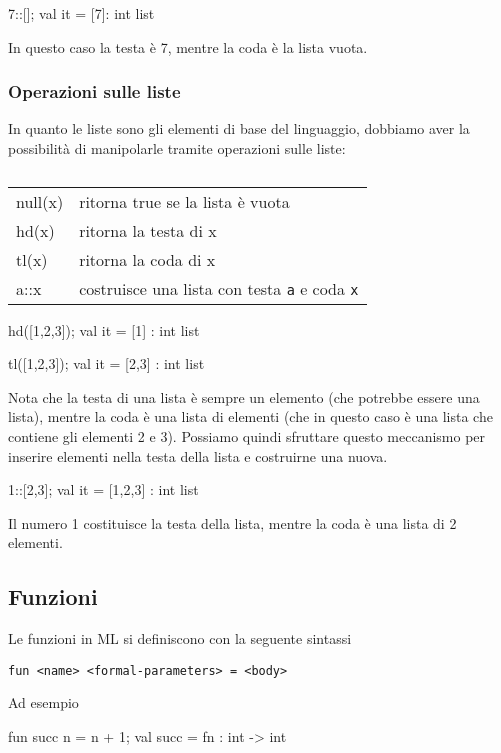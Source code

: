 \documentclass{article}
\begin{document}
\begin{smlcode}
7::[];
val it = [7]: int list
\end{smlcode}
In questo caso la testa è 7, mentre la coda è la lista vuota.

\subsubsection{Operazioni sulle liste}

In quanto le liste sono gli elementi di base del linguaggio, dobbiamo aver la possibilità di manipolarle tramite operazioni sulle liste:

\begin{table}[H]
	\centering
	\begin{tabular}{@{} >{\ttfamily}l l @{}}
	null(x)	& ritorna true se la lista è vuota \\
	hd(x)	& ritorna la testa di x \\
	tl(x)	& ritorna la coda di x \\
	a::x	& costruisce una lista con testa \texttt{a} e coda \texttt{x} \\
	\end{tabular}
	\caption[Operazioni sulle liste]{}
	\label{tab:list-op}
\end{table}

\begin{smlcode}
hd([1,2,3]);
val it = [1] : int list

tl([1,2,3]);
val it = [2,3] : int list
\end{smlcode}

Nota che la testa di una lista è sempre un elemento (che potrebbe essere una lista), mentre la coda è una lista di elementi (che in questo caso è una lista che contiene gli elementi 2 e 3).
Possiamo quindi sfruttare questo meccanismo per inserire elementi nella testa della lista e costruirne una nuova.
\begin{smlcode}
1::[2,3];
val it = [1,2,3] : int list
\end{smlcode}
Il numero 1 costituisce la testa della lista, mentre la coda è una lista di 2 elementi.

\subsection{Funzioni}

Le funzioni in ML si definiscono con la seguente sintassi
\begin{verbatim}
fun <name> <formal-parameters> = <body>
\end{verbatim}
Ad esempio
\begin{smlcode}
fun succ n = n + 1;
val succ = fn : int -> int
\end{smlcode}
\end{document}
